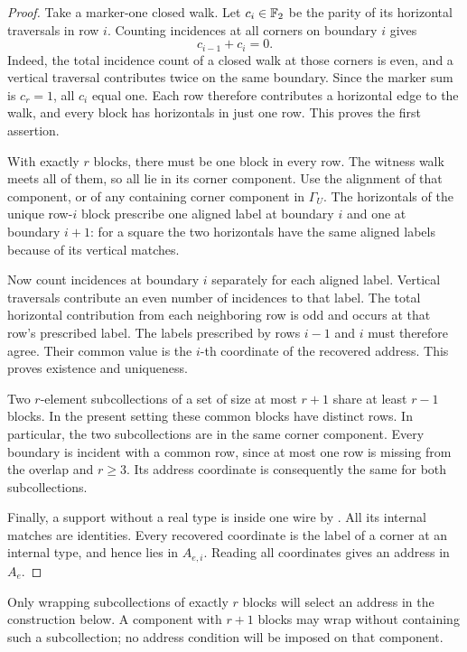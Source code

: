 \begin{proof}
Take a marker-one closed walk. Let \(c_i\in\mathbb F_2\) be the parity of its
horizontal traversals in row \(i\). Counting incidences at all corners
on boundary \(i\) gives
\[
 c_{i-1}+c_i=0.
\]
Indeed, the total incidence count of a closed walk at those corners is
even, and a vertical traversal contributes twice on the same boundary.
Since the marker sum is \(c_r=1\), all \(c_i\) equal one. Each row
therefore contributes a horizontal edge to the walk, and every block
has horizontals in just one row. This proves the first assertion.

With exactly \(r\) blocks, there must be one block in every row.
The witness walk meets all of them, so all lie in its corner component.
Use the alignment of that component, or of any containing corner
component in \(\Gamma_U\). The horizontals of the unique row-\(i\)
block prescribe one aligned label at boundary \(i\) and one at boundary
\(i+1\): for a square the two horizontals have the same aligned labels
because of its vertical matches.

Now count incidences at boundary \(i\) separately for each aligned label.
Vertical traversals contribute an even number of incidences to that
label. The total horizontal contribution from each neighboring row is
odd and occurs at that row's prescribed label. The labels prescribed
by rows \(i-1\) and \(i\) must therefore agree. Their common value is the
\(i\)-th coordinate of the recovered address. This proves existence and
uniqueness.

Two \(r\)-element subcollections of a set of size at most \(r+1\) share
at least \(r-1\) blocks. In the present setting these common blocks have
distinct rows. In particular, the two subcollections are in the same
corner component. Every boundary is incident with a common row, since
at most one row is missing from the overlap and \(r\ge3\). Its address
coordinate is consequently the same for both subcollections.

Finally, a support without a real type is inside one wire by
. All its internal matches are identities.
Every recovered coordinate is the label of a corner at an internal
type, and hence lies in \(A_{e,i}\). Reading all coordinates gives an
address in \(A_e\).
\end{proof}

Only wrapping subcollections of exactly \(r\) blocks will select an
address in the construction below. A component with \(r+1\) blocks may
wrap without containing such a subcollection; no address condition will
be imposed on that component.


